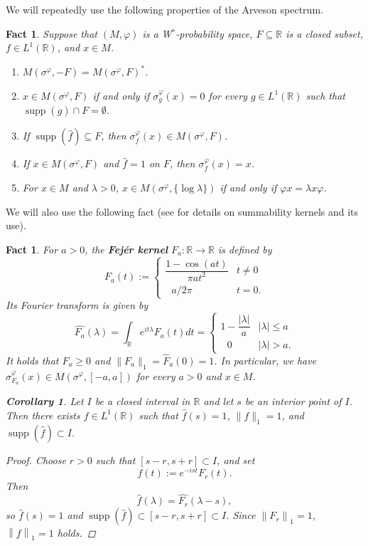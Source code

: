 \documentclass[12pt]{amsart}
\newtheorem{fact}[thm]{Fact}
\newtheorem{cor}[thm]{Corollary}
\theoremstyle{definition}
\newcommand{\norm}[1]{{\left\lVert #1\right\rVert}}
\def\bb{\mathbb}
\def\bb{\mathbb}
\DeclareMathOperator{\supp}{supp}
\begin{document}
We will repeatedly use the following properties of the Arveson spectrum. 
\begin{fact}\label{fact spectralfacts}
Suppose that $(M,\varphi)$ is a W$^*$-probability space, $F\subseteq \bb R$ is a closed subset, $f\in L^1(\mathbb R)$, and $x\in M$.
\begin{enumerate}
    \item $M(\sigma^\varphi,-F)=M(\sigma^\varphi,F)^*$.
    \item $x\in M(\sigma^\varphi,F)$ if and only if $\sigma_g^\varphi(x)=0$ for every $g\in L^1(\mathbb R)$ such that $\operatorname{supp}(\hat{g})\cap F=\emptyset$. 
    \item If $\operatorname{supp}(\hat f)\subseteq F$, then $\sigma_f^\varphi(x)\in M(\sigma^\varphi,F)$.
    \item If $x\in M(\sigma^\varphi,F)$ and $\hat{f}=1$ on $F$, then $\sigma_f^\varphi(x)=x$.
    \item For $x\in M$ and $\lambda>0$, $x\in M(\sigma^{\varphi},\{\log \lambda\})$ if and only if $\varphi x=\lambda x\varphi$.
\end{enumerate}    
\end{fact}
We will also use the following fact (see \cite{AH14,katznelsonharmonic} for details on summability kernels and its use). 
\begin{fact}
For $a>0$, the {\bf Fej\'er kernel} $F_a:\mathbb{R}\to \mathbb{R}$ is defined by 
\[F_a(t):=\begin{cases}\dfrac{1-\cos (at)}{\pi at^2} & t\neq 0\\
\ \ \ a/2\pi & t=0. \end{cases}\]
Its Fourier transform is given by
\[\widehat{F_a}(\lambda)=\int_{\mathbb{R}}e^{it\lambda}F_a(t)dt=\begin{cases}1-\dfrac{|\lambda|}{a} & |\lambda|\le a\\
 \ \ \ 0 & |\lambda|>a.\end{cases}\]
It holds that $F_a\geq 0$ and $\|F_a\|_1=\widehat{F}_a(0)=1$.
In particular, we have $\sigma_{F_a}^{\varphi}(x)\in M(\sigma^{\varphi},[-a,a])$ for every $a>0$ and $x\in M$.

\begin{cor}\label{lem fourier}
    Let $I$ be a closed interval in $\mathbb R$ and let $s$ be an interior point of $I$. Then there exists $f\in L^1(\mathbb R)$ such that $\hat{f}(s)=1$, $\|f\|_1=1$, and $\operatorname{supp}(\hat{f})\subset I$. 
\end{cor}
\begin{proof}
Choose $r>0$ such that $[s-r,s+r]\subset I$, and set
\[
 f(t):=e^{-ist}F_r(t).
\]
Then
\[
 \widehat f(\lambda)=\widehat{F_r}(\lambda-s),
\]
so $\widehat f(s)=1$ and $\supp(\widehat f)\subset [s-r,s+r]\subset I$.  Since $\norm{F_r}_1=1$, $\norm f_1=1$ holds.
\end{proof}
\end{fact}
\end{document}
